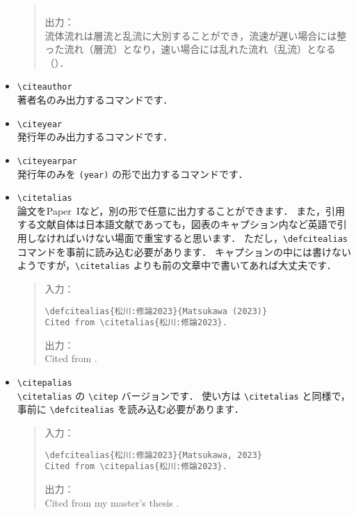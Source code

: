 \begin{itemize}
\begin{quote}
\begin{verbatim}
\end{verbatim}
出力：\\
    流体流れは層流と乱流に大別することができ，流速が遅い場合には整った流れ（層流）となり，速い場合には乱れた流れ（乱流）となる（\citealp{Reynolds:PhilTransRoySoc1883}）．
\end{quote}
    \item \verb|\citeauthor| \\
    著者名のみ出力するコマンドです．
    \item \verb|\citeyear| \\
    発行年のみ出力するコマンドです．
    \item \verb|\citeyearpar| \\
    発行年のみを \verb|(year)| の形で出力するコマンドです．
    \item \verb|\citetalias| \\
    論文をPaper~Iなど，別の形で任意に出力することができます．
    また，引用する文献自体は日本語文献であっても，図表のキャプション内など英語で引用しなければいけない場面で重宝すると思います．
    ただし，\verb|\defcitealias| コマンドを事前に読み込む必要があります．
    キャプションの中には書けないようですが，\verb|\citetalias| よりも前の文章中で書いてあれば大丈夫です．
\begin{quote}
入力：
\begin{verbatim}
\defcitealias{松川:修論2023}{Matsukawa (2023)}
Cited from \citetalias{松川:修論2023}.
\end{verbatim}
出力：\\
    Cited from .
\end{quote}
    \item \verb|\citepalias| \\
    \verb|\citetalias| の \verb|\citep| バージョンです．
    使い方は \verb|\citetalias| と同様で，事前に \verb|\defcitealias| を読み込む必要があります．
\begin{quote}
入力：
\begin{verbatim}
\defcitealias{松川:修論2023}{Matsukawa, 2023}
Cited from \citepalias{松川:修論2023}.
\end{verbatim}
出力：\\
    Cited from my master's thesis .
\end{quote}
\end{itemize}

